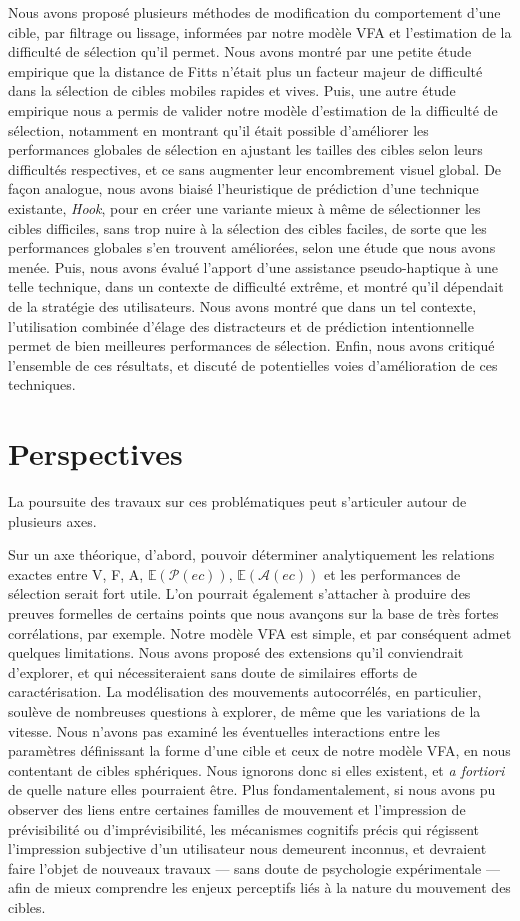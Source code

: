 	Nous avons proposé plusieurs méthodes de modification du comportement d'une cible, par filtrage ou lissage, informées par notre modèle VFA et l'estimation de la difficulté de sélection qu'il permet. Nous avons montré par une petite étude empirique que la distance de Fitts n'était plus un facteur majeur de difficulté dans la sélection de cibles mobiles rapides et vives. Puis, une autre étude empirique nous a permis de valider notre modèle d'estimation de la difficulté de sélection, notamment en montrant qu'il était possible d'améliorer les performances globales de sélection en ajustant les tailles des cibles selon leurs difficultés respectives, et ce sans augmenter leur encombrement visuel global. De façon analogue, nous avons biaisé l'heuristique de prédiction d'une technique existante, \emph{Hook}, pour en créer une variante mieux à même de sélectionner les cibles difficiles, sans trop nuire à la sélection des cibles faciles, de sorte que les performances globales s'en trouvent améliorées, selon une étude que nous avons menée. Puis, nous avons évalué l'apport d'une assistance pseudo-haptique à une telle technique, dans un contexte de difficulté extrême, et montré qu'il dépendait de la stratégie des utilisateurs. Nous avons montré que dans un tel contexte, l'utilisation combinée d'élage des distracteurs et de prédiction intentionnelle permet de bien meilleures performances de sélection. Enfin, nous avons critiqué l'ensemble de ces résultats, et discuté de potentielles voies d'amélioration de ces techniques.
	
	\section*{Perspectives}
	La poursuite des travaux sur ces problématiques peut s'articuler autour de plusieurs axes.
	
	Sur un axe théorique, d'abord, pouvoir déterminer analytiquement les relations exactes entre V, F, A, $\mathbb{E}(\mathcal{P}(ec))$, $\mathbb{E}(\mathcal{A}(ec))$ et les performances de sélection serait fort utile. L'on pourrait également s'attacher à produire des preuves formelles de certains points que nous avançons sur la base de très fortes corrélations, par exemple. Notre modèle VFA est simple, et par conséquent admet quelques limitations. Nous avons proposé des extensions qu'il conviendrait d'explorer, et qui nécessiteraient sans doute de similaires efforts de caractérisation. La modélisation des mouvements autocorrélés, en particulier, soulève de nombreuses questions à explorer, de même que les variations de la vitesse. Nous n'avons pas examiné les éventuelles interactions entre les paramètres définissant la forme d'une cible et ceux de notre modèle VFA, en nous contentant de cibles sphériques. Nous ignorons donc si elles existent, et \emph{a fortiori} de quelle nature elles pourraient être. Plus fondamentalement, si nous avons pu observer des liens entre certaines familles de mouvement et l'impression de prévisibilité ou d'imprévisibilité, les mécanismes cognitifs précis qui régissent l'impression subjective d'un utilisateur nous demeurent inconnus, et devraient faire l'objet de nouveaux travaux --- sans doute de psychologie expérimentale --- afin de mieux comprendre les enjeux perceptifs liés à la nature du mouvement des cibles.
	
